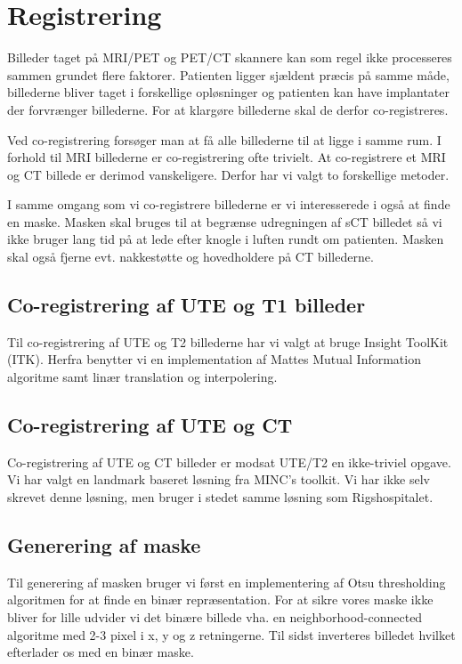 \section{Registrering}

Billeder taget på MRI/PET og PET/CT skannere kan som regel ikke processeres sammen grundet flere faktorer. Patienten ligger sjældent præcis på samme måde, billederne bliver taget i forskellige opløsninger og patienten kan have implantater der forvrænger billederne. For at klargøre billederne skal de derfor co-registreres.

Ved co-registrering forsøger man at få alle billederne til at ligge i samme rum. I forhold til MRI billederne er co-registrering ofte trivielt. At co-registrere et MRI og CT billede er derimod vanskeligere. Derfor har vi valgt to forskellige metoder.

I samme omgang som vi co-registrere billederne er vi interesserede i også at finde en maske. Masken skal bruges til at begrænse udregningen af sCT billedet så vi ikke bruger lang tid på at lede efter knogle i luften rundt om patienten. Masken skal også fjerne evt. nakkestøtte og hovedholdere på CT billederne.

\subsection{Co-registrering af UTE og T1 billeder}

Til co-registrering af UTE og T2 billederne har vi valgt at bruge Insight ToolKit (ITK). Herfra benytter vi en implementation af Mattes Mutual Information algoritme samt linær translation og interpolering.

\subsection{Co-registrering af UTE og CT}

Co-registrering af UTE og CT billeder er modsat UTE/T2 en ikke-triviel opgave. Vi har valgt en landmark baseret løsning fra MINC's toolkit. Vi har ikke selv skrevet denne løsning, men bruger i stedet samme løsning som Rigshospitalet.

\subsection{Generering af maske}

Til generering af masken bruger vi først en implementering af Otsu thresholding algoritmen for at finde en binær repræsentation. For at sikre vores maske ikke bliver for lille udvider vi det binære billede vha. en neighborhood-connected algoritme med 2-3 pixel i x, y og z retningerne. Til sidst inverteres billedet hvilket efterlader os med en binær maske.